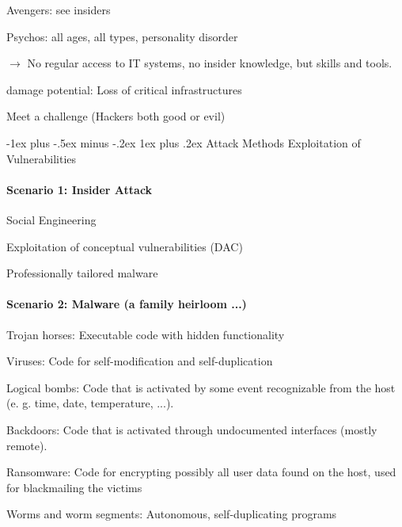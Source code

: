 \documentclass[a4paper]{article}
\makeatletter
\renewcommand{\subsubsection}{\@startsection{subsubsection}{3}{0mm}%
                {-1ex plus -.5ex minus -.2ex}%
                {1ex plus .2ex}%
                {\normalfont\small\bfseries}}
\makeatother
\begin{document}
\begin{multicols}{3}
\begin{itemize*}
\begin{itemize*}
\begin{itemize*}
                \item Avengers: see insiders
                \item Psychos: all ages, all types, personality disorder
                \item[$\rightarrow$] No regular access to IT systems, no insider knowledge, but skills and tools.
            \end{itemize*}
            \item damage potential: Loss of critical infrastructures
        \end{itemize*}
        \item Meet a challenge (Hackers both good or evil)
    \end{itemize*}

    \subsubsection{Attack Methods}
    Exploitation of Vulnerabilities

    \paragraph{Scenario 1: Insider Attack}
    \begin{itemize*}
        \item Social Engineering
        \item Exploitation of conceptual vulnerabilities (DAC)
        \item Professionally tailored malware
    \end{itemize*}

    \paragraph{Scenario 2: Malware (a family heirloom ...)}
    \begin{itemize*}
        \item Trojan horses: Executable code with hidden functionality
        \item Viruses: Code for self-modification and self-duplication
        \item Logical bombs: Code that is activated by some event recognizable from the host (e. g. time, date, temperature, ...).
        \item Backdoors: Code that is activated through undocumented interfaces (mostly remote).
        \item Ransomware: Code for encrypting possibly all user data found on the host, used for blackmailing the victims
        \item Worms and worm segments: Autonomous, self-duplicating programs
    \end{itemize*}


\end{multicols}
\end{document}
